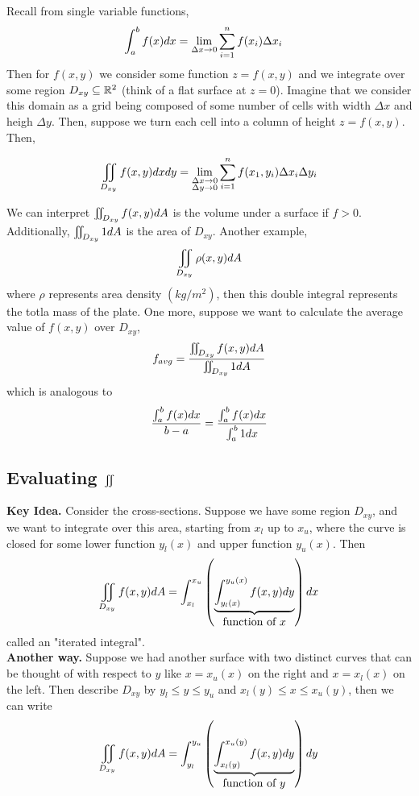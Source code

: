 \documentclass[english, 11pt]{article}
\begin{document}
Recall from single variable functions,
\begin{align*}
  \int_a^b f(x) dx & = \lim_{\Delta x \rightarrow 0} \sum_{i =1}^n f(x_i)\Delta x_i
\end{align*}
Then for $f(x,y)$ we consider some function $z = f(x,y)$ and we integrate over some region $D_{xy} \subseteq {\mathbb{R}}^2$ (think of a flat surface at $z = 0$). Imagine that we consider this domain as a grid being composed of some number of cells with width $\Delta x$ and heigh $\Delta y$. Then, suppose we turn each cell into a column of height $z = f(x,y)$. Then,
\newcommand{\Iint}{\iint\displaylimits}
\newcommand{\iintdxy}{\Iint_{D_{xy}}}
\begin{defn}\label{doubleint}
\begin{align*}
  \iint\displaylimits_{D_{xy}} f(x,y) dx dy = \lim_{\substack{\Delta x \rightarrow 0 \\ \Delta y \rightarrow 0}} \sum_{i =1}^n f(x_1,y_i) \Delta x_i \Delta y_i
\end{align*}

We can interpret $\Iint_{D_{xy}} f(x,y) dA$ is the volume under a surface if $f > 0$. Additionally, $\Iint_{D_{xy}} 1 dA$ is the area of $D_{xy}$. Another example,
\[ \Iint_{D_{xy}} \rho (x,y) dA \]
where $\rho$ represents area density $(kg/m^2)$, then this double integral represents the totla mass of the plate. One more, suppose we want to calculate the average value of $f(x,y)$ over $D_{xy}$,
\[ f_{avg} = \f{\Iint_{D_{xy}}f(x,y) dA}{\Iint_{D_{xy}} 1 dA} \]
which is analogous to
\[ \frac{\int_a^b f(x) dx}{b-a} = \frac{\int_a^b f(x) dx}{\int_a^b 1 dx} \]

\end{defn}

\subsection{Evaluating $\Iint$}

\textbf{Key Idea.} Consider the cross-sections. Suppose we have some region $D_{xy}$, and we want to integrate over this area, starting from $x_l$ up to $x_u$, where the curve is closed for some lower function $y_l(x)$ and upper function $y_u(x)$. Then
\[ \iintdxy f(x,y) dA = \int_{x_l}^{x_u} \left( \ub{\int_{y_l(x)}^{y_u(x)} f(x,y) dy}_{\mbox{function of $x$}} \right) dx \]
called an "iterated integral". \\

\textbf{Another way.} Suppose we had another surface with two distinct curves that can be thought of with respect to $y$ like $x = x_u(x)$ on the right and $x = x_l(x)$ on the left. Then describe $D_{xy}$ by $y_l \leq y \leq y_u$ and $x_l(y) \leq x \leq x_u(y)$, then we can write
\[ \iintdxy f(x,y) dA = \int_{y_l}^{y_u} \left( \ub{\int_{x_l(y)}^{x_u(y)} f(x,y) dy}_{\mbox{function of $y$}} \right) dy \]
\end{document}

